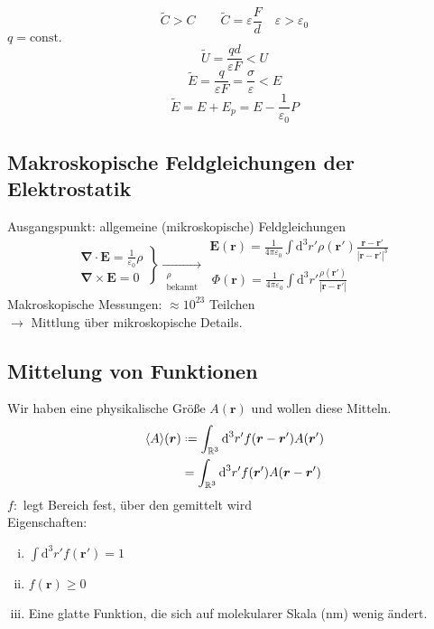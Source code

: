 \documentclass[titlepage,11pt,a4paper,ngerman]{report}
\newcommand*{\defeq}{\mathrel{\vcenter{\baselineskip0.5ex \lineskiplimit0pt \hbox{\scriptsize.}\hbox{\scriptsize.}}}=}
\newcommand{\tx}[1]{\textrm{#1}}
\newcommand{\const}{\tx{const.}}
\newcommand{\dd}{\tx{d}}
\renewcommand{\Phi}{\varPhi}
\newcommand{\kq}{\frac{1}{4\pi\epsilon_0}}
\renewcommand{\vec}[1]{\boldsymbol{#1}}
\renewcommand{\epsilon}{\varepsilon}
\begin{document}

\begin{equation*}
\tilde{C} > C \qquad \tilde{C} = \epsilon \frac{F}{d} \quad \epsilon > \epsilon_0
\end{equation*}
$ q = \const $
\begin{equation*}
\tilde{U} = \frac{qd}{\epsilon F} < U
\end{equation*}
\begin{equation*}
\tilde{E} = \frac{q}{\epsilon F} = \frac{\sigma}{\epsilon} < E
\end{equation*}
\begin{equation*}
\tilde{E} = E + E_p = E - \frac{1}{\epsilon_0} P
\end{equation*}

\subsection{Makroskopische Feldgleichungen der Elektrostatik}

Ausgangspunkt: allgemeine (mikroskopische) Feldgleichungen
\begin{equation*}
\left.\begin{array}{c}
\vec{\nabla} \cdot \vec{E} = \frac{1}{\epsilon_0} \rho \\[10pt]
\vec{\nabla} \times \vec{E} = 0
\end{array}\right\} \underset{\substack{\rho \\ \tx{bekannt}}}{\rightarrow} \begin{array}{l}
\vec{E}(\vec{r}) = \kq \int \dd ^3 r' \rho(\vec{r}') \frac{\vec{r} - \vec{r}'}{|\vec{r} - \vec{r}'|^3} \\[10pt]
\, \Phi(\vec{r}) = \kq \int \dd ^3 r' \frac{\rho(\vec{r}')}{|\vec{r} - \vec{r}'|}
\end{array}
\end{equation*}
Makroskopische Messungen: $ \approx 10^{23} $ Teilchen\\
$ \rightarrow $ Mittlung über mikroskopische Details.

\subsection{Mittelung von Funktionen}

Wir haben eine physikalische Größe $ A(\vec{r}) $ und wollen diese Mitteln.
\begin{align*}
\langle A \rangle (\vec{r}) &\defeq \int_{\mathbb{R}^3} \dd ^3 r' f(\vec{r} - \vec{r}') A(\vec{r}') \\
&= \int_{\mathbb{R}^3} \dd^3 r' f(\vec{r}') A(\vec{r} - \vec{r}')
\end{align*}
$ f : $ legt Bereich fest, über den gemittelt wird\\
Eigenschaften:
\begin{enumerate}[i)]
	\item $ \int \dd^3 r' f(\vec{r}') = 1 $
	\item $ f(\vec{r}) \ge 0 $
	\item Eine glatte Funktion, die sich auf molekularer Skala (nm) wenig ändert.
\end{enumerate}
\end{document}

